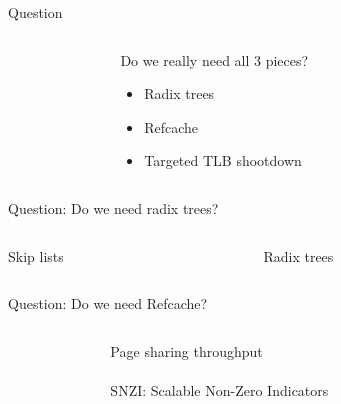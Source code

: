 \documentclass[aspectratio=169]{beamer}
\newcommand{\bi}{\begin{itemize}}
\newcommand{\ei}{\end{itemize}}
\begin{document}
\begin{frame}{Question}
  \begin{columns}[T]
    \begin{column}{0.3\textwidth}
    \end{column}
    \begin{column}{0.4\textwidth}
      Do we really need all 3 pieces?
      \bi
    \item Radix trees
    \item Refcache
    \item Targeted TLB shootdown
      \ei
    \end{column}
    \begin{column}{0.3\textwidth}
    \end{column}
  \end{columns}
\end{frame}

\begin{frame}{Question: Do we need radix trees?}
  \begin{columns}[T]
    \begin{column}{0.5\textwidth}
      \begin{center}
        Skip lists\\
        
      \end{center}
    \end{column}
    \begin{column}{0.5\textwidth}
      \begin{center}
        \pause
        Radix trees\\
        
      \end{center}
    \end{column}
  \end{columns}
\end{frame}

\begin{frame}{Question: Do we need Refcache?}
  \begin{columns}[T]
    \begin{column}{0.2\textwidth}
    \end{column}
    \begin{column}{0.6\textwidth}
      \begin{center}
        Page sharing throughput\\
        \\
        \vspace{1em}
        SNZI: Scalable Non-Zero Indicators
    \end{center}
    \end{column}
    \begin{column}{0.2\textwidth}
    \end{column}
  \end{columns}
\end{frame}
\end{document}
